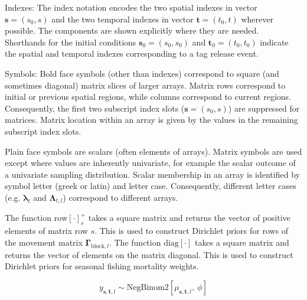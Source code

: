 \documentclass{article}
\begin{document}
\noindent Indexes: The index notation encodes the two spatial indexes in vector $\boldsymbol{s} = \left( s_0,s \right)$ and the two temporal indexes in vector $\boldsymbol{t} = \left( t_0, t \right)$ wherever possible. The components are shown explicitly where they are needed. Shorthands for the initial conditions $\boldsymbol{s}_0 = (s_0,s_0)$ and $\boldsymbol{t}_0 = (t_0,t_0)$ indicate the spatial and temporal indexes corresponding to a tag release event.
\newline

\noindent Symbols: Bold face symbols (other than indexes) correspond to square (and sometimes diagonal) matrix slices of larger arrays. Matrix rows correspond to initial or previous spatial regions, while columns correspond to current regions. Consequently, the first two subscript index slots ($\boldsymbol{s} = (s_0, s)$) are suppressed for matrices. Matrix location within an array is given by the values in the remaining subscript index slots. 

Plain face symbols are scalars (often elements of arrays). Matrix symbols are used except where values are inherently univariate, for example the scalar outcome of a univariate sampling distribution. Scalar membership in an array is identified by symbol letter (greek or latin) and letter case. Consequently, different letter cases (e.g. $\boldsymbol{\lambda}_{l}$ and $\boldsymbol{\Lambda}_{t,l}$) correspond to different arrays.
\newline

\noindent The function $\mathrm{row} \! \left[ \cdot \right]^{+}_{s}$ takes a square matrix and returns the vector of positive elements of matrix row $s$. This is used to construct Dirichlet priors for rows of the movement matrix $\boldsymbol{\Gamma}_{\mathrm{block},l}$. The function $\mathrm{diag} \! \left[ \cdot \right]$ takes a square matrix and returns the vector of elements on the matrix diagonal. This is used to construct Dirichlet priors for seasonal fishing mortality weights.

\begin{equation}
  \label{eq:model-sampling}
  y_{\boldsymbol{s}, \boldsymbol{t},l} \sim \mathrm{NegBinom2} \!
    \left[\mu_{\boldsymbol{s}, \boldsymbol{t},l} \mathrm{,} \: \phi \right]
\end{equation}

\end{document}
